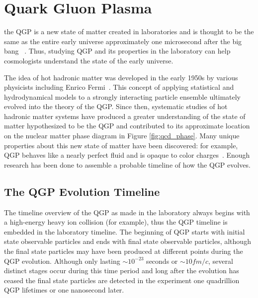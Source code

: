 \section{Quark Gluon Plasma}
the QGP is a new state of matter created in laboratories and is thought to be the same as the entire early universe approximately one microsecond after the big bang ~\cite{RAFELSKI2013155}. Thus, studying QGP and its properties in the laboratory can help cosmologists understand the state of the early universe.

The idea of hot hadronic matter was developed in the early 1950s by various physicists including Enrico Fermi~\cite{Fermi01071950}. This concept of applying statistical and hydrodynamical models to a strongly interacting particle ensemble ultimately evolved into the theory of the QGP. Since then, systematic studies of hot hadronic matter systems have produced a greater understanding of the state of matter hypothesized to be the QGP and contributed to its approximate location on the nuclear matter phase diagram in Figure \ref{fig:qcd_phase}. Many unique properties about this new state of matter have been discovered: for example, QGP behaves like a nearly perfect fluid and is opaque to color charges~\cite{Akiba:2015jwa}. Enough research has been done to assemble a probable timeline of how the QGP evolves.

\subsection{The QGP Evolution Timeline}
The timeline overview of the QGP as made in the laboratory always begins with a high-energy heavy ion collision (\auau for example), thus the QGP timeline is embedded in the laboratory timeline. The beginning of QGP starts with initial state observable particles and ends with final state observable particles, although the final state particles may have been produced at different points during the QGP evolution. Although only lasting $\sim10^{-23}$ seconds or $\sim10 fm/c$, several distinct stages occur during this time period and long after the evolution has ceased the final state particles are detected in the experiment one quadrillion QGP lifetimes or one nanosecond later.

